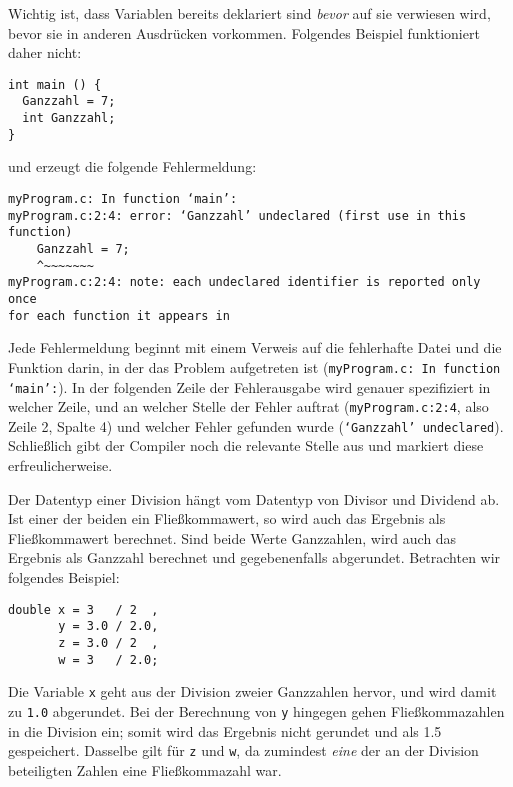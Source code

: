 

Wichtig ist, dass Variablen bereits deklariert sind \emph{bevor} auf sie verwiesen wird, \ie bevor sie in anderen Ausdrücken vorkommen. Folgendes Beispiel funktioniert daher nicht:
\begin{codebox}
\begin{verbatim}
int main () {
  Ganzzahl = 7;
  int Ganzzahl;
}
\end{verbatim}
\end{codebox}
und erzeugt die folgende Fehlermeldung:
\begin{cmdbox}
\begin{verbatim}
myProgram.c: In function ‘main’:
myProgram.c:2:4: error: ‘Ganzzahl’ undeclared (first use in this
function)
    Ganzzahl = 7;
    ^~~~~~~~
myProgram.c:2:4: note: each undeclared identifier is reported only once
for each function it appears in
\end{verbatim}
\end{cmdbox}
Jede Fehlermeldung beginnt mit einem Verweis auf die fehlerhafte Datei und die Funktion darin, in der das Problem aufgetreten ist (\texttt{myProgram.c: In function ‘main’:}). In der folgenden Zeile der Fehlerausgabe wird genauer spezifiziert in welcher Zeile, und an welcher Stelle der Fehler auftrat (\texttt{myProgram.c:2:4}, also  Zeile 2, Spalte 4) und welcher Fehler gefunden wurde (\texttt{‘Ganzzahl’ undeclared}). Schließlich gibt der Compiler noch die relevante Stelle aus und markiert diese erfreulicherweise.

\begin{hintbox}
Der Datentyp einer Division hängt vom Datentyp von Divisor und Dividend ab. Ist einer der beiden ein Fließkommawert, so wird auch das Ergebnis als Fließkommawert berechnet. Sind beide Werte Ganzzahlen, wird auch das Ergebnis als Ganzzahl berechnet und gegebenenfalls abgerundet. Betrachten wir folgendes Beispiel:
\begin{codebox}
\begin{verbatim}
double x = 3   / 2  ,
       y = 3.0 / 2.0,
       z = 3.0 / 2  ,
       w = 3   / 2.0;
\end{verbatim}
\end{codebox}
Die Variable \texttt{x} geht aus der Division zweier Ganzzahlen hervor, und wird damit zu \texttt{1.0} abgerundet. Bei der Berechnung von \texttt{y} hingegen gehen Fließkommazahlen in die Division ein; somit wird das Ergebnis nicht gerundet und als 1.5 gespeichert. Dasselbe gilt für \texttt{z} und \texttt{w}, da zumindest \emph{eine} der an der Division beteiligten Zahlen eine Fließkommazahl war.
\end{hintbox}

